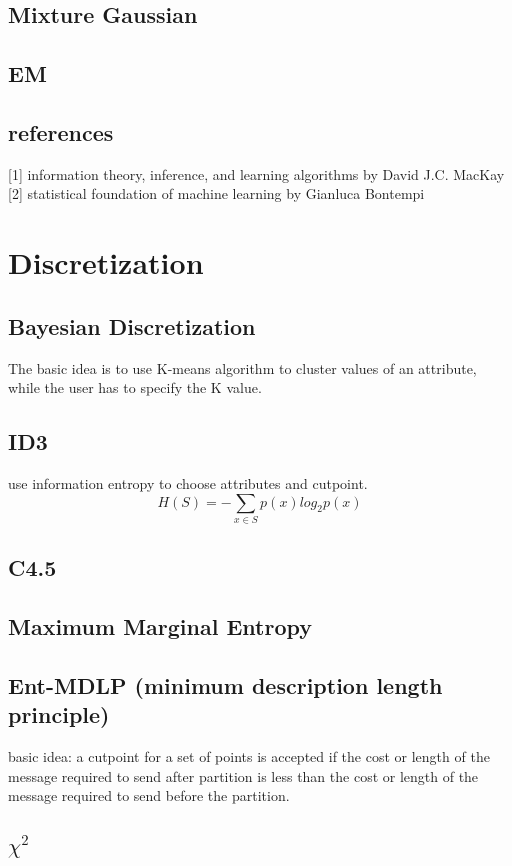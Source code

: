 \documentclass[10pt,a4paper]{book}
\begin{document}
\section{Mixture Gaussian}
\section{EM}

  
\section{references}
[1] information theory, inference, and learning algorithms by David J.C. MacKay    
[2] statistical foundation of machine learning by Gianluca Bontempi  

\chapter{Discretization}
\section {Bayesian Discretization}
The basic idea is to use K-means algorithm to cluster values of an attribute, while the user has to specify the K value.
\section {ID3}
use information entropy to choose attributes and cutpoint.
$$H(S) = - \sum_{x \in S} p(x)log_2 {p(x)} $$
\section {C4.5}

\section {Maximum Marginal Entropy}

\section {Ent-MDLP (minimum description length principle)}
basic idea: a cutpoint for a set of points is accepted if the cost or length of the message required to send after partition is less than the cost or length of the message required to send before the partition.

\section {$ \chi^2 $}
\end{document}
